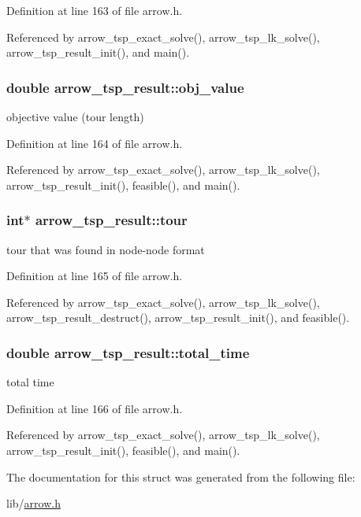 Definition at line 163 of file arrow.h.

Referenced by arrow\_\-tsp\_\-exact\_\-solve(), arrow\_\-tsp\_\-lk\_\-solve(), arrow\_\-tsp\_\-result\_\-init(), and main().\hypertarget{structarrow__tsp__result_f0fae9756e4c924517addf05988cfcb9}{
\subsubsection{\setlength{\rightskip}{0pt plus 5cm}double {\bf arrow\_\-tsp\_\-result::obj\_\-value}}}
\label{structarrow__tsp__result_f0fae9756e4c924517addf05988cfcb9}


objective value (tour length) 

Definition at line 164 of file arrow.h.

Referenced by arrow\_\-tsp\_\-exact\_\-solve(), arrow\_\-tsp\_\-lk\_\-solve(), arrow\_\-tsp\_\-result\_\-init(), feasible(), and main().\hypertarget{structarrow__tsp__result_48433b03146d6ca3423a555ea2139d52}{
\subsubsection{\setlength{\rightskip}{0pt plus 5cm}int$\ast$ {\bf arrow\_\-tsp\_\-result::tour}}}
\label{structarrow__tsp__result_48433b03146d6ca3423a555ea2139d52}


tour that was found in node-node format 

Definition at line 165 of file arrow.h.

Referenced by arrow\_\-tsp\_\-exact\_\-solve(), arrow\_\-tsp\_\-lk\_\-solve(), arrow\_\-tsp\_\-result\_\-destruct(), arrow\_\-tsp\_\-result\_\-init(), and feasible().\hypertarget{structarrow__tsp__result_82ea7aa0320d932892602d34339a9276}{
\subsubsection{\setlength{\rightskip}{0pt plus 5cm}double {\bf arrow\_\-tsp\_\-result::total\_\-time}}}
\label{structarrow__tsp__result_82ea7aa0320d932892602d34339a9276}


total time 

Definition at line 166 of file arrow.h.

Referenced by arrow\_\-tsp\_\-exact\_\-solve(), arrow\_\-tsp\_\-lk\_\-solve(), arrow\_\-tsp\_\-result\_\-init(), feasible(), and main().

The documentation for this struct was generated from the following file:\begin{CompactItemize}
\item 
lib/\hyperlink{arrow_8h}{arrow.h}\end{CompactItemize}
